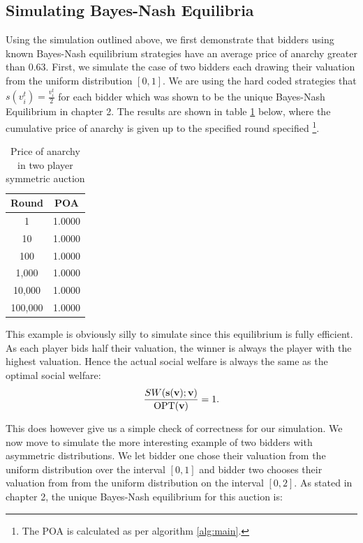 \documentclass[12pt,twoside]{reedthesis}
\begin{document}
\subsection{Simulating Bayes-Nash Equilibria}
Using the simulation outlined above, we first demonstrate that bidders using known Bayes-Nash equilibrium strategies have an average price of anarchy greater than $0.63$. First, we simulate the case of two bidders each drawing their valuation from the uniform distribution $[0,1]$. We are using the hard coded strategies that $s(v^t_i) = \frac{v^t_i}{2}$ for each bidder which was shown to be the unique Bayes-Nash Equilibrium in chapter 2. The results are shown in table \ref{table:1} below, where the cumulative price of anarchy is given up to the specified round specified 
\footnote{The POA is calculated as per algorithm \ref{alg:main}. %
}.

\begin{table}[h!]
\begin{center}
\begin{tabular}{ |c|c| }
	\hline
	Round & POA \\
	\hline
	1 & 1.0000 \\
	10 & 1.0000 \\
	100 & 1.0000 \\
	1,000 & 1.0000 \\
	10,000 & 1.0000 \\
	100,000 & 1.0000 \\
	\hline
\end{tabular}
\caption{Price of anarchy in two player symmetric auction}
\label{table:1}
\end{center} 
\end{table}

This example is obviously silly to simulate since this equilibrium is fully efficient. As each player bids half their valuation, the winner is always the player with the highest valuation. Hence the actual social welfare is always the same as the optimal social welfare: $$\frac{SW(\textbf{s}(\textbf{v}); \textbf{v})}{\text{OPT}(\textbf{v})} = 1.$$

This does however give us a simple check of correctness for our simulation. We now move to simulate the more interesting example of two bidders with asymmetric distributions. We let bidder one chose their valuation from the uniform distribution over the interval $[0,1]$ and bidder two chooses their valuation from from the uniform distribution on the interval $[0,2]$. As stated in chapter 2, the unique Bayes-Nash equilibrium for this auction is:
\end{document}
